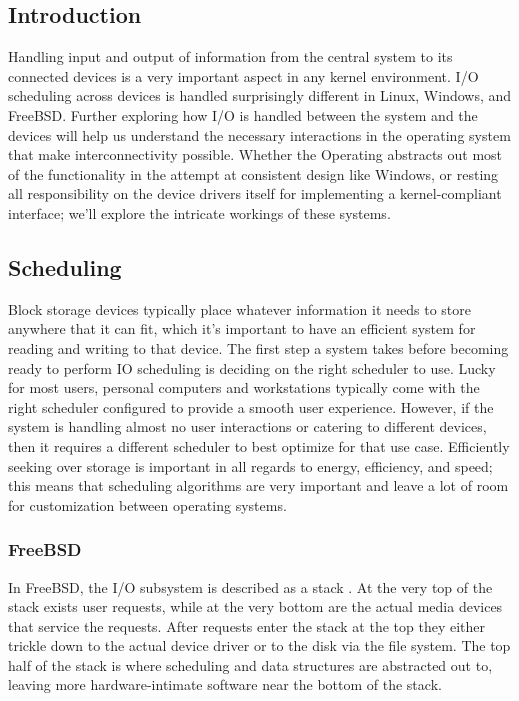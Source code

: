 
\subsection{Introduction}
Handling input and output of information from the central system to its connected devices is a very important aspect in any kernel environment.
I/O scheduling across devices is handled surprisingly different in Linux, Windows, and FreeBSD.
Further exploring how I/O is handled between the system and the devices will help us understand the necessary interactions in the operating system that make interconnectivity possible.
Whether the Operating abstracts out most of the functionality in the attempt at consistent design like Windows, or resting all responsibility on the device drivers itself for implementing a kernel-compliant interface; we'll explore the intricate workings of these systems.

\subsection{Scheduling}
\label{sec:Scheduling}
\par Block storage devices typically place whatever information it needs to store anywhere that it can fit, which it's important to have an efficient system for reading and writing to that device.
The first step a system takes before becoming ready to perform IO scheduling is deciding on the right scheduler to use.
Lucky for most users, personal computers and workstations typically come with the right scheduler configured to provide a smooth user experience.
However, if the system is handling almost no user interactions or catering to different devices, then it requires a different scheduler to best optimize for that use case.
Efficiently seeking over storage is important in all regards to energy, efficiency, and speed; this means that scheduling algorithms are very important and leave a lot of room for customization between operating systems.

\subsubsection{FreeBSD}
\label{sub:Scheduling FreeBSD}
In FreeBSD, the I/O subsystem is described as a stack \cite{bsd:2}.
At the very top of the stack exists user requests, while at the very bottom are the actual media devices that service the requests.
After requests enter the stack at the top they either trickle down to the actual device driver or to the disk via the file system.
The top half of the stack is where scheduling and data structures are abstracted out to, leaving more hardware-intimate software near the bottom of the stack.

